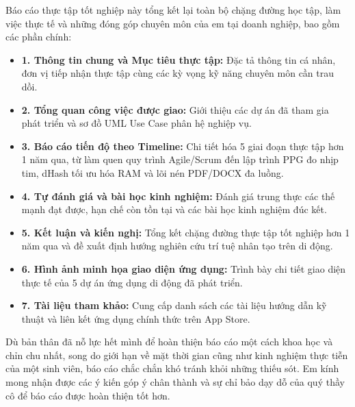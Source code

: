 \documentclass[12pt, a4paper]{article}
\begin{document}
Báo cáo thực tập tốt nghiệp này tổng kết lại toàn bộ chặng đường học tập, làm việc thực tế và những đóng góp chuyên môn của em tại doanh nghiệp, bao gồm các phần chính:
\begin{itemize}
    \item \textbf{1. Thông tin chung và Mục tiêu thực tập:} Đặc tả thông tin cá nhân, đơn vị tiếp nhận thực tập cùng các kỳ vọng kỹ năng chuyên môn cần trau dồi.
    \item \textbf{2. Tổng quan công việc được giao:} Giới thiệu các dự án đã tham gia phát triển và sơ đồ UML Use Case phân hệ nghiệp vụ.
    \item \textbf{3. Báo cáo tiến độ theo Timeline:} Chi tiết hóa 5 giai đoạn thực tập hơn 1 năm qua, từ làm quen quy trình Agile/Scrum đến lập trình PPG đo nhịp tim, dHash tối ưu hóa RAM và lõi nén PDF/DOCX đa luồng.
    \item \textbf{4. Tự đánh giá và bài học kinh nghiệm:} Đánh giá trung thực các thế mạnh đạt được, hạn chế còn tồn tại và các bài học kinh nghiệm đúc kết.
    \item \textbf{5. Kết luận và kiến nghị:} Tổng kết chặng đường thực tập tốt nghiệp hơn 1 năm qua và đề xuất định hướng nghiên cứu trí tuệ nhân tạo trên di động.
    \item \textbf{6. Hình ảnh minh họa giao diện ứng dụng:} Trình bày chi tiết giao diện thực tế của 5 dự án ứng dụng di động đã phát triển.
    \item \textbf{7. Tài liệu tham khảo:} Cung cấp danh sách các tài liệu hướng dẫn kỹ thuật và liên kết ứng dụng chính thức trên App Store.
\end{itemize}

Dù bản thân đã nỗ lực hết mình để hoàn thiện báo cáo một cách khoa học và chỉn chu nhất, song do giới hạn về mặt thời gian cũng như kinh nghiệm thực tiễn của một sinh viên, báo cáo chắc chắn khó tránh khỏi những thiếu sót. Em kính mong nhận được các ý kiến góp ý chân thành và sự chỉ bảo dạy dỗ của quý thầy cô để báo cáo được hoàn thiện tốt hơn.

\newpage
\renewcommand{\contentsname}{MỤC LỤC}
\tableofcontents
\newpage

\end{document}
